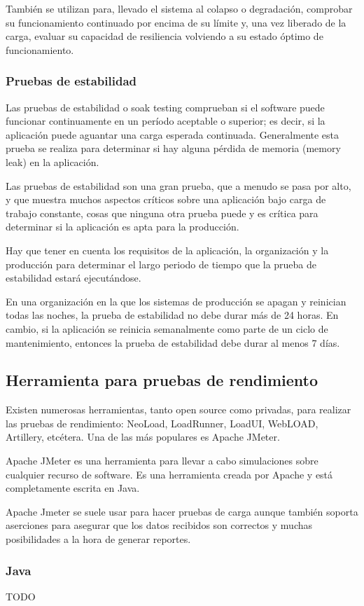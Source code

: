 También se utilizan para, llevado el sistema al colapso o degradación, comprobar su funcionamiento continuado por encima de su límite y, una vez liberado de la carga, evaluar su capacidad de resiliencia volviendo a su estado óptimo de funcionamiento.

\subsubsection{Pruebas de estabilidad}

Las pruebas de estabilidad o soak testing comprueban si el software puede funcionar continuamente en un período aceptable o superior; es decir, si la aplicación puede aguantar una carga esperada continuada. Generalmente esta prueba se realiza para determinar si hay alguna pérdida de memoria (memory leak) en la aplicación.

Las pruebas de estabilidad son una gran prueba, que a menudo se pasa por alto, y que muestra muchos aspectos críticos sobre una aplicación bajo carga de trabajo constante, cosas que ninguna otra prueba puede y es crítica para determinar si la aplicación es apta para la producción.

Hay que tener en cuenta los requisitos de la aplicación, la organización y la producción para determinar el largo periodo de tiempo que la prueba de estabilidad estará ejecutándose.

En una organización en la que los sistemas de producción se apagan y reinician todas las noches, la prueba de estabilidad no debe durar más de 24 horas. En cambio, si la aplicación se reinicia semanalmente como parte de un ciclo de mantenimiento, entonces la prueba de estabilidad debe durar al menos 7 días.

\subsection{Herramienta para pruebas de rendimiento}

Existen numerosas herramientas, tanto open source como privadas, para realizar las pruebas de rendimiento: NeoLoad, LoadRunner, LoadUI, WebLOAD, Artillery, etcétera. Una de las más populares es Apache JMeter.

Apache JMeter es una herramienta para llevar a cabo simulaciones sobre cualquier recurso de software. Es una herramienta creada por Apache y está completamente escrita en Java.

Apache Jmeter se suele usar para hacer pruebas de carga aunque también soporta aserciones para asegurar que los datos recibidos son correctos y muchas posibilidades a la hora de generar reportes.

\subsubsection{Java}

TODO
